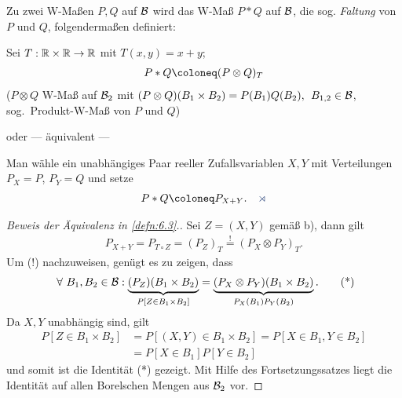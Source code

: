 \begin{defn}
\label{defn:6.3}
Zu zwei W-Maßen $P,Q$ auf ${\mathcal{B}}$ wird das W-Maß $P\ast
Q$ auf ${\mathcal{B}}$, die sog. \emph{Faltung} von $P$ und $Q$, folgendermaßen
definiert:
\begin{defnenum}
\item
Sei $T: \mathbb{R} \times \mathbb{R} \to \mathbb{R}$ mit $T(x,y)=x+y$;
\begin{align*}
P\ast Q\defl (P\otimes Q)_{T}
\end{align*}
($P\otimes Q$ W-Maß auf ${\mathcal{B}}_{2}$ mit $(P\otimes Q)(B_{1}\times B_{2})=
P(B_{1})Q(B_{2}), \;\, B_{1,2}\in {\mathcal{B}}$, sog.\ Produkt-W-Maß von $P$ und
$Q$)

oder --- äquivalent ---
\item
Man wähle ein unabhängiges Paar reeller Zufallsvariablen $X,Y$ mit Verteilungen
$P_{X}=P$, $P_{Y}=Q$ und setze
\begin{align*}
P\ast Q\defl P_{X+Y}.\fishhere
\end{align*}
\end{defnenum}
\end{defn}

\begin{proof}[Beweis der Äquivalenz in \ref{defn:6.3}.]
Sei $Z=(X,Y)$ gemäß b), dann gilt
\begin{align*}
P_{X+Y} = P_{T\circ Z} = (P_Z)_T
\overset{!}{=} (P_X\otimes P_Y)_T.
\end{align*}
Um (!) nachzuweisen, genügt es zu zeigen, dass
\begin{align*}
\forall B_1,B_2\in\BB : \underbrace{(P_Z)(B_1\times B_2)}_{P[Z\in B_1\times
B_2]} = \underbrace{(P_X\otimes P_Y)(B_1\times B_2)}_{P_X(B_1)P_Y(B_2)}.\tag{*}
\end{align*}
Da $X,Y$ unabhängig sind, gilt
\begin{align*}
P[Z\in B_1\times B_2] &= P[(X,Y)\in B_1\times B_2] = P[X\in B_1, Y\in B_2]\\
&= P[X\in B_1]P[Y\in B_2]
\end{align*}
und somit ist die Identität (*) gezeigt. Mit Hilfe des Fortsetzungssatzes liegt
die Identität auf allen Borelschen Mengen aus $\mathcal{B}_2$ vor.\qedhere 
\end{proof}


